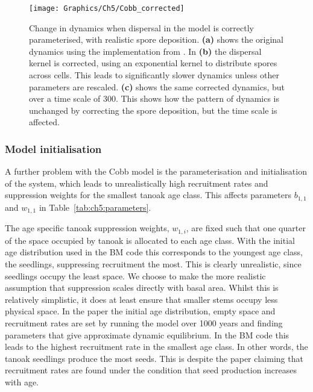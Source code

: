 \begin{figure}[t]
    \begin{center}
        \texttt{[image: Graphics/Ch5/Cobb\_corrected]}
        \caption[Change in model dynamics under corrected parameters]{Change in dynamics when dispersal in the model is correctly parameterised, with realistic spore deposition. \textbf{(a)} shows the original dynamics using the implementation from \citet{cobb_ecosystem_2012}. In \textbf{(b)} the dispersal kernel is corrected, using an exponential kernel to distribute spores across cells. This leads to significantly slower dynamics unless other parameters are rescaled. \textbf{(c)} shows the same corrected dynamics, but over a time scale of \SI{300}{\years}. This shows how the pattern of dynamics is unchanged by correcting the spore deposition, but the time scale is affected.\label{fig:ch5:cobb_spatial_rate}}
    \end{center}
\end{figure}

\subsubsection{Model initialisation}

A further problem with the Cobb model is the parameterisation and initialisation of the system, which leads to unrealistically high recruitment rates and suppression weights for the smallest tanoak age class. This affects parameters $b_{1,1}$ and $w_{1,1}$ in Table~\ref{tab:ch5:parameters}.

The age specific tanoak suppression weights, $w_{1,i}$, are fixed such that one quarter of the space occupied by tanoak is allocated to each age class. With the initial age distribution used in the BM code this corresponds to the youngest age class, the seedlings, suppressing recruitment the most. This is clearly unrealistic, since seedlings occupy the least space. We choose to make the more realistic assumption that suppression scales directly with basal area. Whilst this is relatively simplistic, it does at least ensure that smaller stems occupy less physical space. In the paper the initial age distribution, empty space and recruitment rates are set by running the model over 1000 years and finding parameters that give approximate dynamic equilibrium. In the BM code this leads to the highest recruitment rate in the smallest age class. In other words, the tanoak seedlings produce the most seeds. This is despite the paper claiming that recruitment rates are found under the condition that seed production increases with age.

